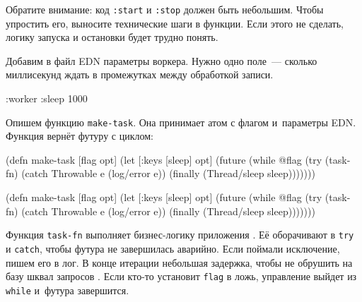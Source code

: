 \fi

\fi

Обратите внимание: код \verb|:start| и \verb|:stop| должен быть небольшим. Чтобы
упростить его, выносите технические шаги в функции. Если этого не сделать,
логику запуска и остановки будет трудно понять.

Добавим в файл EDN параметры воркера. Нужно одно поле~--- сколько миллисекунд
ждать в промежутках между обработкой записи.

\begin{english}
  \begin{clojure}
{:worker {:sleep 1000}}
  \end{clojure}
\end{english}


\label{make-task}

Опишем функцию \verb|make-task|. Она принимает атом с флагом и~параметры
EDN. Функция вернёт футуру с циклом:

\pagebreaklarge

\ifnarrow

\begin{english}
  \begin{clojure/lines}
(defn make-task
  [flag opt]
  (let [{:keys [sleep]} opt]
    (future
      (while @flag
        (try
          (task-fn)
          (catch Throwable e
            (log/error e))
          (finally
            (Thread/sleep
              sleep)))))))
  \end{clojure/lines}
\end{english}

\else

\begin{english}
  \begin{clojure/lines}
(defn make-task
  [flag opt]
  (let [{:keys [sleep]} opt]
    (future
      (while @flag
        (try
          (task-fn)
          (catch Throwable e
            (log/error e))
          (finally
            (Thread/sleep sleep)))))))
  \end{clojure/lines}
\end{english}

\fi

Функция \verb|task-fn| выполняет бизнес-логику приложения . Её
оборачивают в \verb|try| и \verb|catch|, чтобы футура не завершилась
аварийно. Если поймали исключение, пишем его в лог. В конце итерации небольшая
задержка, чтобы не обрушить на базу шквал запросов . Если кто-то
установит \verb|flag| в ложь, управление выйдет из \verb|while| и~футура
завершится.

